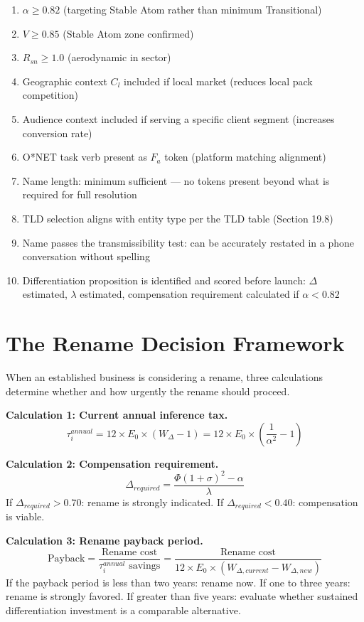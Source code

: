\documentclass[12pt, openany]{book}
\theoremstyle{thmstyle}
\theoremstyle{defstyle}
\begin{document}
\begin{keybox}
\begin{enumerate}[leftmargin=1.5em, topsep=2pt, start=11]
  \item $\alpha \geq 0.82$ (targeting Stable Atom rather than minimum Transitional)
  \item $V \geq 0.85$ (Stable Atom zone confirmed)
  \item $R_{sn} \geq 1.0$ (aerodynamic in sector)
  \item Geographic context $C_l$ included if local market (reduces local pack competition)
  \item Audience context included if serving a specific client segment (increases conversion rate)
  \item O*NET task verb present as $F_a$ token (platform matching alignment)
  \item Name length: minimum sufficient --- no tokens present beyond what is required for full resolution
  \item TLD selection aligns with entity type per the TLD table (Section 19.8)
  \item Name passes the transmissibility test: can be accurately restated in a phone conversation without spelling
  \item Differentiation proposition is identified and scored before launch: $\Delta$ estimated, $\lambda$ estimated, compensation requirement calculated if $\alpha < 0.82$
\end{enumerate}
\end{keybox}

\section{The Rename Decision Framework}

When an established business is considering a rename, three calculations determine whether and how urgently the rename should proceed.

\textbf{Calculation 1: Current annual inference tax.}
\[
\tau_i^{annual} = 12 \times E_0 \times (W_\Delta - 1) = 12 \times E_0 \times \left(\frac{1}{\alpha^2} - 1\right)
\]

\textbf{Calculation 2: Compensation requirement.}
\[
\Delta_{required} = \frac{\Phi(1+\sigma)^2 - \alpha}{\lambda}
\]
If $\Delta_{required} > 0.70$: rename is strongly indicated. If $\Delta_{required} < 0.40$: compensation is viable.

\textbf{Calculation 3: Rename payback period.}
\[
\text{Payback} = \frac{\text{Rename cost}}{\tau_i^{annual} \text{ savings}} = \frac{\text{Rename cost}}{12 \times E_0 \times (W_{\Delta,current} - W_{\Delta,new})}
\]
If the payback period is less than two years: rename now. If one to three years: rename is strongly favored. If greater than five years: evaluate whether sustained differentiation investment is a comparable alternative.
\end{document}

